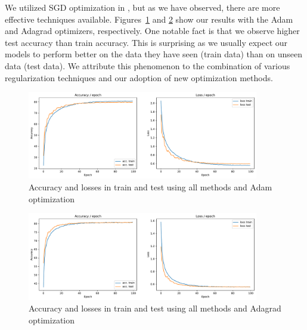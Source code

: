 We utilized SGD optimization in , but as we have observed, there are more effective techniques available. Figures~\ref{fig:combined_adam} and \ref{fig:combined_adagrad} show our results with the Adam and Adagrad optimizers, respectively. One notable fact is that we observe higher test accuracy than train accuracy. This is surprising as we usually expect our models to perform better on the data they have seen (train data) than on unseen data (test data). We attribute this phenomenon to the combination of various regularization techniques and our adoption of new optimization methods.

\begin{figure}[H]
    \centering
    \includegraphics*[width=0.9\textwidth]{figs/CNN/combined_adam.pdf}
    \caption{Accuracy and losses in train and test using all methods and Adam optimization}
    \label{fig:combined_adam}
\end{figure}

\begin{figure}[H]
    \centering
    \includegraphics*[width=0.9\textwidth]{figs/CNN/combined_adagrad.pdf}
    \caption{Accuracy and losses in train and test using all methods and Adagrad optimization}
    \label{fig:combined_adagrad}
\end{figure}